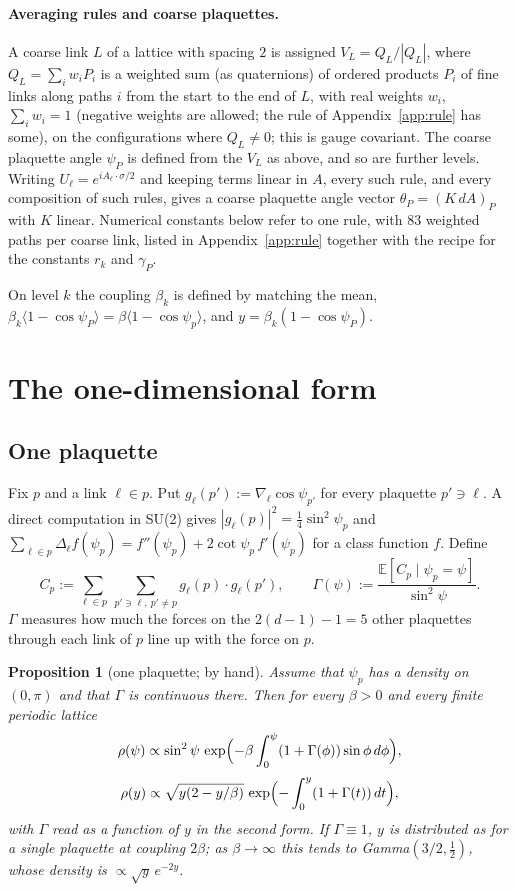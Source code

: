\documentclass[11pt,a4paper]{article}
\newtheorem{proposition}[theorem]{Proposition}
\theoremstyle{definition}
\theoremstyle{remark}
\newcommand{\E}{\mathbb{E}}
\begin{document}
\paragraph{Averaging rules and coarse plaquettes.} A coarse link $L$ of a lattice with spacing $2$ is assigned $V_L=Q_L/|Q_L|$, where $Q_L=\sum_iw_iP_i$ is a weighted sum (as quaternions) of ordered products $P_i$ of fine links along paths $i$ from the start to the end of $L$, with real weights $w_i$, $\sum_iw_i=1$ (negative weights are allowed; the rule of Appendix~\ref{app:rule} has some), on the configurations where $Q_L\ne0$; this is gauge covariant. The coarse plaquette angle $\psi_P$ is defined from the $V_L$ as above, and so are further levels. Writing $U_\ell=e^{iA_\ell\cdot\sigma/2}$ and keeping terms linear in $A$, every such rule, and every composition of such rules, gives a coarse plaquette angle vector $\theta_P=(K\,dA)_P$ with $K$ linear. Numerical constants below refer to one rule, with 83 weighted paths per coarse link, listed in Appendix~\ref{app:rule} together with the recipe for the constants $r_k$ and $\gamma_P$.

On level $k$ the coupling $\beta_k$ is defined by matching the mean, $\beta_k\langle1-\cos\psi_P\rangle=\beta\langle1-\cos\psi_p\rangle$, and $y=\beta_k(1-\cos\psi_P)$.

\section{The one-dimensional form}\label{sec:sd}

\subsection{One plaquette}

Fix $p$ and a link $\ell\in p$. Put $g_\ell(p'):=\nabla_\ell\cos\psi_{p'}$ for every plaquette $p'\ni\ell$. A direct computation in SU(2) gives $|g_\ell(p)|^2=\tfrac14\sin^2\psi_p$ and $\sum_{\ell\in p}\Delta_\ell f(\psi_p)=f''(\psi_p)+2\cot\psi_p\,f'(\psi_p)$ for a class function $f$. Define
\[
C_p:=\sum_{\ell\in p}\ \sum_{p'\ni\ell,\ p'\ne p}g_\ell(p)\cdot g_\ell(p'),\qquad \Gamma(\psi):=\frac{\E[C_p\mid\psi_p=\psi]}{\sin^2\psi}.
\]
$\Gamma$ measures how much the forces on the $2(d-1)-1=5$ other plaquettes through each link of $p$ line up with the force on $p$.

\begin{proposition}[one plaquette; by hand]\label{prop:one}
Assume that $\psi_p$ has a density on $(0,\pi)$ and that $\Gamma$ is continuous there. Then for every $\beta>0$ and every finite periodic lattice
\[
\rho(\psi)\propto\sin^2\psi\,\exp\Bigl(-\beta\int_0^\psi(1+\Gamma(\phi))\sin\phi\,d\phi\Bigr),\]\[
\rho(y)\propto\sqrt{y(2-y/\beta)}\,\exp\Bigl(-\int_0^y(1+\Gamma(t))\,dt\Bigr),
\]
with $\Gamma$ read as a function of $y$ in the second form. If $\Gamma\equiv1$, $y$ is distributed as for a single plaquette at coupling $2\beta$; as $\beta\to\infty$ this tends to Gamma$(3/2,\tfrac12)$, whose density is $\propto\sqrt y\,e^{-2y}$.
\end{proposition}
\end{document}
